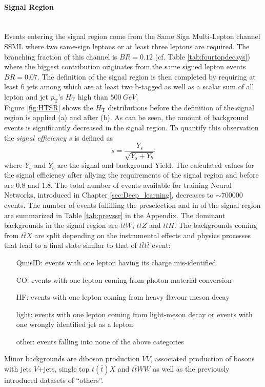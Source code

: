 \paragraph{Signal Region} \mbox{} \\

Events entering the signal region come from the Same Sign Multi-Lepton channel SSML where two same-sign leptons or at least three leptons are required. The branching fraction of this channel is $BR = 0.12$ (cf. Table \ref{tab:fourtopdecays}) where the biggest contribution originates from the same signed lepton events $BR = 0.07$. The definition of the signal region is then completed by requiring at least 6 jets among which are at least two b-tagged as well as a scalar sum of all lepton and jet $p_{\text{T}}$'s $H_{\text{T}}$ high than $\SI{500}{GeV}$.   \\
Figure \ref{fig:HTSR} shows the $H_{\text{T}}$ distributions before the definition of the signal region is applied (a) and after (b). As can be seen, the amount of background events is significantly decreased in the signal region. To quantify this observation the \textit{signal efficiency} $s$ is defined as
\begin{equation}
\label{eq:sigeff}
s = \frac{Y_s}{\sqrt{Y_s + Y_b}}
\end{equation}
where $Y_s$ and $Y_b$ are the signal and background Yield. The calculated values for the signal efficiency after allying the requirements of the signal region and before are 0.8 and 1.8. The total number of events available for training Neural Networks, introduced in Chapter \ref{sec:Deep_learning}, decreases to $\sim 700000$ events. The number of events fulfilling the preselection and in of the signal region are summarized in Table \ref{tab:prevssr} in the Appendix. The dominant backgrounds in the signal region are $t\bar{t}W$, $t\bar{t}Z$ and $t\bar{t}H$. The backgrounds coming from $t\bar{t}X$ are split depending on the instrumental effects and physics processes that lead to a final state similar to that of $t\bar{t}t\bar{t}$ event:
\begin{enumerate}[leftmargin=2cm]
\item[QmisID:] events with one lepton having its charge mis-identified
\item[CO:] events with one lepton coming from photon material conversion
\item[HF:] events with one lepton coming from heavy-flavour meson decay
\item[light:] events with one lepton coming from light-meson decay or events with one wrongly identified jet as a lepton
\item[other:] events falling into none of the above categories
\end{enumerate}
Minor backgrounds are diboson production $VV$, associated production of bosons with jets $V$+jets, single top $t(\bar{t})X$ and $t\bar{t}WW$ as well as the previously introduced datasets of ``others''.


